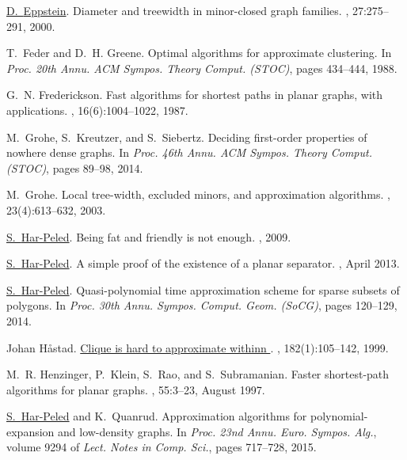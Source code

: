 \documentclass[12pt]{article}
\theoremstyle{remark}\theoremheaderfont{\sf}\theorembodyfont{\upshape}
\numberwithin{figure}{section}\numberwithin{table}{section}\numberwithin{equation}{section}
\begin{document}
{\begin{thebibliography}{vdSOdBV98}
\href{http://www.ics.uci.edu/~eppstein/}{D.~{Eppstein}}.
\newblock  Diameter and treewidth in minor-closed graph families.
, 27:275--291, 2000.

T.~Feder and D.~H. Greene.
\newblock  Optimal algorithms for approximate clustering.
\newblock In {\em Proc. 20th Annu. ACM Sympos. Theory Comput. {\em(STOC)}},
  pages 434--444, 1988.

G.~N. Frederickson.
\newblock  Fast algorithms for shortest paths in planar graphs, with
  applications.
, 16(6):1004--1022, 1987.

M.~Grohe, S.~Kreutzer, and S.~Siebertz.
\newblock  Deciding first-order properties of nowhere dense graphs.
\newblock In {\em Proc. 46th Annu. ACM Sympos. Theory Comput. {\em(STOC)}},
  pages 89--98, 2014.

M.~Grohe.
\newblock  Local tree-width, excluded minors, and approximation algorithms.
, 23(4):613--632, 2003.

\href{http://sarielhp.org}{S.~{{Har-Peled}}}.
\newblock  Being fat and friendly is not enough.
, 2009.

\href{http://sarielhp.org}{S.~{{Har-Peled}}}.
\newblock  A simple proof of the existence of a planar separator.
, April 2013.

\href{http://sarielhp.org}{S.~{{Har-Peled}}}.
\newblock  Quasi-polynomial time approximation scheme for sparse subsets of
  polygons.
\newblock In {\em Proc. 30th Annu. Sympos. Comput. Geom. {\em(SoCG)}}, pages
  120--129, 2014.

Johan H{\aa}stad.
\newblock \href{http://dx.doi.org/10.1007/BF02392825}{Clique is hard to
  approximate withinn {}}.
, 182(1):105--142, 1999.

M.~R. Henzinger, P.~Klein, S.~Rao, and S.~Subramanian.
\newblock  Faster shortest-path algorithms for planar graphs.
, 55:3--23, August 1997.

\href{http://sarielhp.org}{S.~{{Har-Peled}}} and K.~Quanrud.
\newblock  Approximation algorithms for polynomial-expansion and low-density
  graphs.
\newblock In {\em Proc. 23nd Annu. Euro. Sympos. Alg.\CNFESA}, volume 9294 of
  {\em Lect. Notes in Comp. Sci.}, pages 717--728, 2015.


\end{thebibliography}}
\end{document}
